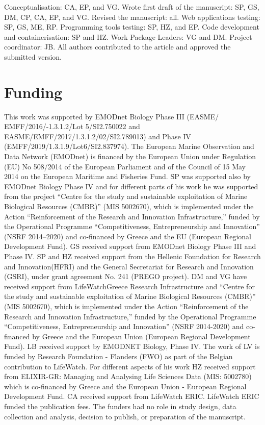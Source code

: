 Conceptualisation: CA, EP, and VG. Wrote first draft of the manuscript: SP, GS,
DM, CP, CA, EP, and VG. Revised the manuscript: all. Web applications testing:
SP, GS, ME, RP. Programming tools testing: SP, HZ, and EP. Code development and
containerisation: SP and HZ. Work Package Leaders: VG and DM. Project
coordinator: JB. All authors contributed to the article and approved the
submitted version.

\section*{Funding}
This work was supported by EMODnet Biology Phase III
(EASME/ EMFF/2016/-1.3.1.2/Lot 5/SI2.750022 and EASME/EMFF/2017/1.3.1.2/02/SI2.789013)
and Phase IV (EMFF/2019/1.3.1.9/Lot6/SI2.837974). The European Marine
Observation and Data Network (EMODnet) is financed by the European Union under
Regulation (EU) No 508/2014 of the European Parliament and of the Council of 15
May 2014 on the European Maritime and Fisheries Fund. SP was supported also by
EMODnet Biology Phase IV and for different parts of his work he was supported
from the project “Centre for the study and sustainable exploitation of Marine
Biological Resources (CMBR)” (MIS 5002670), which is implemented under the
Action “Reinforcement of the Research and Innovation Infrastructure,” funded by
the Operational Programme “Competitiveness, Entrepreneurship and Innovation”
(NSRF 2014–2020) and co-financed by Greece and the EU (European Regional
Development Fund). GS received support from EMODnet Biology Phase III and Phase
IV. SP and HZ received support from the Hellenic Foundation for Research and
Innovation(HFRI) and the General Secretariat for Research and Innovation
(GSRI), under grant agreement No. 241 (PREGO project). DM and VG have received
support from LifeWatchGreece Research Infrastructure \parencite{arvanitidis_lifewatchgreece_2016}
and “Centre for the study and sustainable exploitation of Marine Biological
Resources (CMBR)” (MIS 5002670), which is implemented under the Action
“Reinforcement of the Research and Innovation Infrastructure,” funded by the
Operational Programme “Competitiveness, Entrepreneurship and Innovation”
(NSRF 2014-2020) and co-financed by Greece and the European Union (European
Regional Development Fund). LB received support by EMODNET Biology, Phase IV.
The work of LV is funded by Research Foundation - Flanders (FWO) as part of the
Belgian contribution to LifeWatch. For different aspects of his work HZ
received support from ELIXIR-GR: Managing and Analysing Life Sciences Data
(MIS: 5002780) which is co-financed by Greece and the European Union - European
Regional Development Fund. CA received support from LifeWatch ERIC. LifeWatch
ERIC funded the publication fees. The funders had no role in study design, data
collection and analysis, decision to publish, or preparation of the manuscript.


